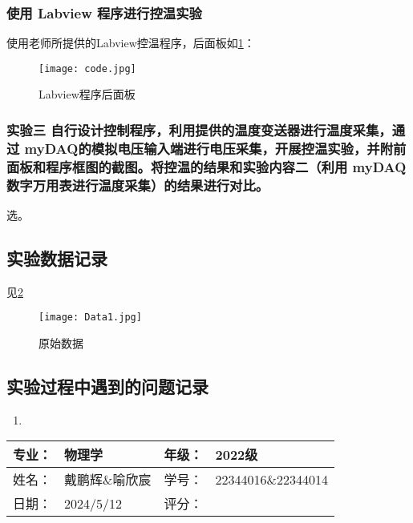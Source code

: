 \documentclass[dvipsnames, svgnames,a4paper,11pt]{article}
\begin{document}
	\subsubsection{使用 Labview 程序进行控温实验}

        使用老师所提供的Labview控温程序，后面板如\cref{fig:fig-code}：  

        \begin{figure}[htbp]
            \centering
            \texttt{[image: code.jpg]} 
            \caption{Labview程序后面板}
            \label{fig:fig-code}
        \end{figure}
    


	\subsubsection{实验三 \quad 自行设计控制程序，利用提供的温度变送器进行温度采集，通过 myDAQ的模拟电压输入端进行电压采集，开展控温实验，并附前面板和程序框图的截图。将控温的结果和实验内容二（利用 myDAQ 数字万用表进行温度采集）的结果进行对比。}

    选。








\subsection{实验数据记录}

	见\cref{fig:data}

	\begin{figure}[htbp]
		\centering
		{\texttt{[image: Data1.jpg]}\label{fig:data1}}
		\quad

		\caption{原始数据}
		\label{fig:data}
	\end{figure}




\subsection{实验过程中遇到的问题记录}

\begin{enumerate}
	\item 
\end{enumerate}
	

\clearpage
\begin{table}
	\renewcommand\arraystretch{1.7}
	\begin{tabularx}{\textwidth}{|X|X|X|X|}
	\hline
	专业：& 物理学 &年级：& 2022级\\
	\hline
	姓名： & 戴鹏辉\&喻欣宸 & 学号：& 22344016\&22344014\\
	\hline
    日期：& 2024/5/12 & 评分： &\\
	\hline
	\end{tabularx}
\end{table}
\end{document}
